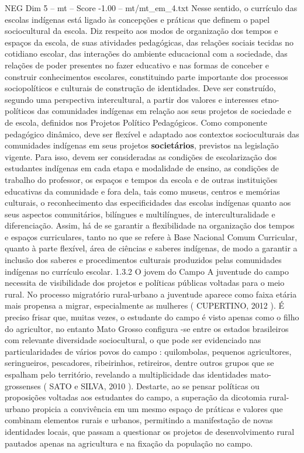 \begin{textsample}{NEG Dim 5 – mt – Score -1.00 – mt/mt\_em\_4.txt}
Nesse sentido, o currículo das escolas indígenas está ligado às concepções e práticas que definem o papel sociocultural da escola.
Diz respeito aos modos de organização dos tempos e espaços da escola, de suas atividades pedagógicas, das relações sociais tecidas no cotidiano escolar, das interações do ambiente educacional com a sociedade, das relações de poder presentes no fazer educativo e nas formas de conceber e construir conhecimentos escolares, constituindo parte importante dos processos sociopolíticos e culturais de construção de identidades.
Deve ser construído, segundo uma perspectiva intercultural, a partir dos valores e interesses etno-políticos das comunidades indígenas em relação aos seus projetos de sociedade e de escola, definidos nos Projetos Político Pedagógicos.
Como componente pedagógico dinâmico, deve ser flexível e adaptado aos contextos socioculturais das comunidades indígenas em seus projetos \textbf{societários}, previstos na legislação vigente.
Para isso, devem ser consideradas as condições de escolarização dos estudantes indígenas em cada etapa e modalidade de ensino, as condições de trabalho do professor, os espaços e tempos da escola e de outras instituições educativas da comunidade e fora dela, tais como museus, centros e memórias culturais, o reconhecimento das especificidades das escolas indígenas quanto aos seus aspectos comunitários, bilíngues e multilíngues, de interculturalidade e diferenciação.
Assim, há de se garantir a flexibilidade na organização dos tempos e espaços curriculares, tanto no que se refere à Base Nacional Comum Curricular, quanto à parte flexível, área de ciências e saberes indígenas, de modo a garantir a inclusão dos saberes e procedimentos culturais produzidos pelas comunidades indígenas no currículo escolar. 1.3.2 O jovem do Campo A juventude do campo necessita de visibilidade dos projetos e políticas públicas voltadas para o meio rural.
No processo migratório rural-urbano a juventude aparece como faixa etária mais propensa a migrar, especialmente as mulheres ( CUPERTINO, 2012 ).
É preciso frisar que, muitas vezes, o estudante do campo é visto apenas como o filho do agricultor, no entanto Mato Grosso configura -se entre os estados brasileiros com relevante diversidade sociocultural, o que pode ser evidenciado nas particularidades de vários povos do campo : quilombolas, pequenos agricultores, seringueiros, pescadores, ribeirinhos, retireiros, dentre outros grupos que se espalham pelo território, revelando a multiplicidade das identidades mato-grossenses ( SATO e SILVA, 2010 ).
Destarte, ao se pensar políticas ou proposições voltadas aos estudantes do campo, a superação da dicotomia rural-urbano propicia a convivência em um mesmo espaço de práticas e valores que combinam elementos rurais e urbanos, permitindo a manifestação de novas identidades locais, que passam a questionar os projetos de desenvolvimento rural pautados apenas na agricultura e na fixação da população no campo.

\end{textsample}
